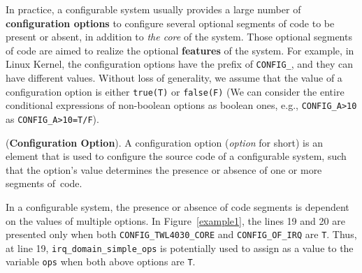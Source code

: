 In practice, a configurable system usually provides a large number of
{\bf configuration options} to configure several optional segments of code
to be present or absent, in addition to
\textit{the core} of the system.
%
Those optional segments of code are aimed to realize the
optional \textbf{features} of the system.
%
For example, in Linux Kernel, the configuration options have the
prefix of \texttt{CONFIG\_}, and they can have different
values. Without loss of generality, we assume that the value of a
configuration option is either \texttt{true(T)} or
\texttt{false(F)} (We can consider the entire conditional
  expressions of non-boolean options as boolean ones, e.g.,
  \texttt{CONFIG\_A>10} as \texttt{CONFIG\_A>10=T/F}).

\begin{Definition}{({\bf Configuration Option}).}
A configuration option ({\em option} for short) is an element that is used
to configure the source code of a configurable system, such that the
option's value determines the presence or absence of one or more
segments of~code.
\end{Definition}

In a configurable system, the presence or absence of code segments is
dependent on the values of multiple options. In Figure~\ref{example1},
the lines 19 and 20 are presented only when both
\texttt{CONFIG\_TWL4030\_CORE} and \texttt{CONFIG\_OF\_IRQ} are
\texttt{T}. Thus, at line 19, \texttt{irq\_domain\_simple\_ops} is
potentially used to assign as a value to the variable \texttt{ops}
when both above options are \texttt{T}.


